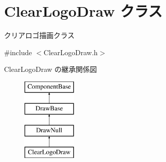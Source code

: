 \hypertarget{class_clear_logo_draw}{}\section{Clear\+Logo\+Draw クラス}
\label{class_clear_logo_draw}


クリアロゴ描画クラス  




{\ttfamily \#include $<$Clear\+Logo\+Draw.\+h$>$}

Clear\+Logo\+Draw の継承関係図\begin{figure}[H]
\begin{center}
\leavevmode
\includegraphics[height=4.000000cm]{class_clear_logo_draw}
\end{center}
\end{figure}
